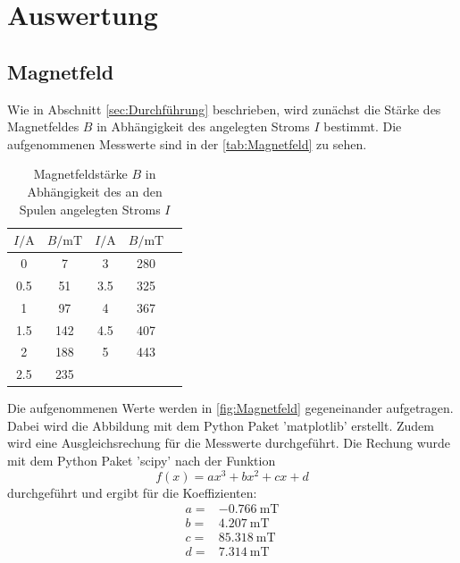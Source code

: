 \section{Auswertung}
\label{sec:Auswertung}
\subsection{Magnetfeld}
Wie in Abschnitt \ref{sec:Durchführung} beschrieben, wird zunächst die Stärke des Magnetfeldes $B$ in Abhängigkeit des angelegten Stroms $I$ bestimmt.
Die aufgenommenen Messwerte sind in der \autoref{tab:Magnetfeld} zu sehen.

\begin{table}
    \centering
    \caption{Magnetfeldstärke $B$ in Abhängigkeit des an den Spulen angelegten Stroms $I$}
    \begin{tabular}{S[table-format=3.1] S S S S}
        \toprule
        $I / \si{\ampere}$ & $B / \si{\milli\tesla}$ &$I / \si{\ampere}$ & $B / \si{\milli\tesla}$ \\
           &     7 &   3   & 280 \\
        0.5 &    51 &   3.5 & 325 \\
        1   &    97 &   4   & 367 \\
        1.5 &   142 &   4.5 & 407 \\
        2   &   188 &   5   & 443 \\
        2.5 &   235 &       &     \\
        \bottomrule
    \end{tabular}
    \label{tab:Magnetfeld}
\end{table}
Die aufgenommenen Werte werden in \autoref{fig:Magnetfeld} gegeneinander aufgetragen.
Dabei wird die Abbildung mit dem Python Paket 'matplotlib' \cite{matplotlib} erstellt.
Zudem wird eine Ausgleichsrechung für die Messwerte durchgeführt.
Die Rechung wurde mit dem Python Paket 'scipy' \cite{scipy} nach der Funktion
\begin{equation*}
    f(x) = ax^3 +bx^2+cx+d
\end{equation*}
durchgeführt und ergibt für die Koeffizienten:
\begin{align*}
    a =& \SI{-0.766}{\milli\tesla}   \\
    b =& \SI{4.207}{\milli\tesla} \\
    c =& \SI{85.318}{\milli\tesla} \\
    d =& \SI{7.314}{\milli\tesla} \\
\end{align*}

